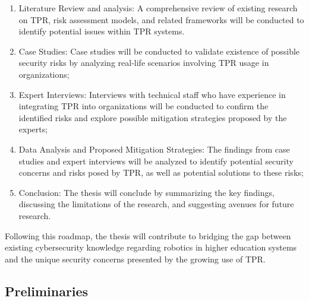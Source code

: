 \begin{enumerate}
  \item Literature Review and analysis: A comprehensive review of existing research on \ac{TPR}, risk assessment models, and related
  frameworks will be conducted to identify potential issues within \ac{TPR} systems.
  \item Case Studies: Case studies will be conducted to validate existence of possible security risks by analyzing real-life scenarios
  involving \ac{TPR} usage in organizations;
  \item Expert Interviews: Interviews with technical staff who have experience in integrating \ac{TPR} into organizations will be
  conducted to confirm the identified risks and explore possible mitigation strategies proposed by the experts;
  \item Data Analysis and Proposed Mitigation Strategies: The findings from case studies and expert interviews will be analyzed to
  identify potential security concerns and risks posed by \ac{TPR}, as well as potential solutions to these risks;
  \item Conclusion: The thesis will conclude by summarizing the key findings, discussing the limitations of the research, and suggesting avenues for future research.
\end{enumerate}
Following this roadmap, the thesis will contribute to bridging the gap between existing cybersecurity knowledge regarding robotics in
higher education systems and the unique security concerns presented by the growing use of \ac{TPR}.



\subsection{Preliminaries}


